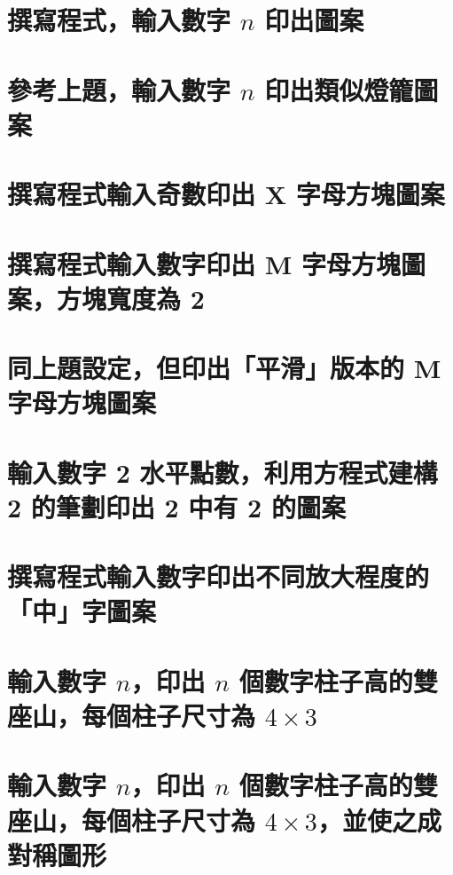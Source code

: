 \section{撰寫程式，輸入數字 $n$ 印出圖案}


\section{參考上題，輸入數字 $n$ 印出類似燈籠圖案}


\section{撰寫程式輸入奇數印出 X 字母方塊圖案}


\section{撰寫程式輸入數字印出 M 字母方塊圖案，方塊寬度為 2}


\section{同上題設定，但印出「平滑」版本的 M 字母方塊圖案}


\section{輸入數字 2 水平點數，利用方程式建構 2 的筆劃印出 2 中有 2 的圖案}


\section{撰寫程式輸入數字印出不同放大程度的「中」字圖案}


\section{輸入數字 $n$，印出 $n$ 個數字柱子高的雙座山，每個柱子尺寸為 $4\times 3$}


\section{輸入數字 $n$，印出 $n$ 個數字柱子高的雙座山，每個柱子尺寸為 $4\times 3$，並使之成對稱圖形}


